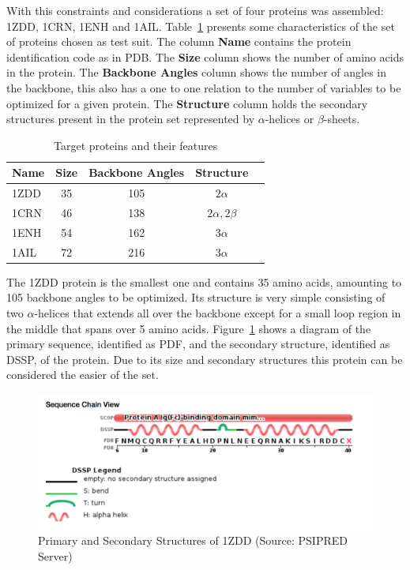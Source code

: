 With this constraints and considerations a set of four proteins was assembled: 1ZDD, 1CRN, 1ENH and 1AIL. Table~\ref{tab:protein-targets} presents some characteristics of the set of proteins chosen as test suit.
The column \textbf{Name} contains the protein identification code as in PDB.
The \textbf{Size} column shows the number of amino acids in the protein.
The \textbf{Backbone Angles} column shows the number of angles in the backbone,
this also has a one to one relation to the number of variables to be optimized
for a given protein. The \textbf{Structure} column holds the secondary structures
present in the protein set represented by $\alpha$-helices or $\beta$-sheets.

\begin{table}[bh]
  \centering
  \begin{tabular}{ l | c | c | c | c }
    \hline \hline
    Name & Size & Backbone Angles & Structure         \\ \hline \hline
    1ZDD & 35   & 105             & $2\alpha$         \\ \hline
    1CRN & 46   & 138             & $2\alpha, 2\beta$ \\ \hline
    1ENH & 54   & 162             & $3\alpha$         \\ \hline
    1AIL & 72   & 216             & $3\alpha$         \\ \hline
    \hline
  \end{tabular}
  \caption{Target proteins and their features}
  \label{tab:protein-targets}
\end{table}

The 1ZDD protein is the smallest one and contains 35 amino acids, amounting
to 105 backbone angles to be optimized. Its structure is very simple consisting
of two $\alpha$-helices that extends all over the backbone except for a small
loop region in the middle that spans over 5 amino acids.
Figure~\ref{fig:1zdd-ss} shows a diagram of the primary sequence, identified as PDF, and the secondary structure, identified as DSSP, of the protein. Due to its size and
secondary structures this protein can be considered the easier of the set.

\begin{figure}[ht]
    \centering
    \includegraphics[scale=0.55]{Figuras/1zdd-ss.png}
    \caption{Primary and Secondary Structures of 1ZDD (Source: PSIPRED Server)}
    \label{fig:1zdd-ss}
\end{figure}

